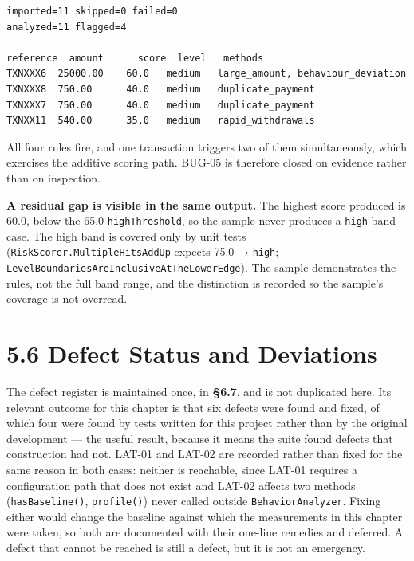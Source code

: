 \documentclass[
  12pt,
]{report}
\begin{document}
\begin{verbatim}
imported=11 skipped=0 failed=0
analyzed=11 flagged=4

reference  amount      score  level   methods
TXNXXX6  25000.00    60.0   medium   large_amount, behaviour_deviation
TXNXXX8  750.00      40.0   medium   duplicate_payment
TXNXXX7  750.00      40.0   medium   duplicate_payment
TXNXX11  540.00      35.0   medium   rapid_withdrawals
\end{verbatim}

All four rules fire, and one transaction triggers two of them
simultaneously, which exercises the additive scoring path. BUG-05 is
therefore closed on evidence rather than on inspection.

\textbf{A residual gap is visible in the same output.} The highest score
produced is 60.0, below the 65.0 \texttt{highThreshold}, so the sample
never produces a \texttt{high}-band case. The high band is covered only
by unit tests (\texttt{RiskScorer.Multiple\-Hits\-Add\-Up} expects 75.0 →
\texttt{high}; \texttt{Level\-Boundaries\-Are\-Inclusive\-At\-The\-Lower\-Edge}). The
sample demonstrates the rules, not the full band range, and the
distinction is recorded so the sample's coverage is not overread.

\section{5.6 Defect Status and
Deviations}\label{defect-status-and-deviations}

The defect register is maintained once, in \textbf{§6.7}, and is not
duplicated here. Its relevant outcome for this chapter is that six
defects were found and fixed, of which four were found by tests written
for this project rather than by the original development --- the useful
result, because it means the suite found defects that construction had
not. LAT-01 and LAT-02 are recorded rather than fixed for the same
reason in both cases: neither is reachable, since LAT-01 requires a
configuration path that does not exist and LAT-02 affects two methods
(\texttt{hasBaseline()}, \texttt{profile()}) never called outside
\texttt{Behavior\-Analyzer}. Fixing either would change the baseline
against which the measurements in this chapter were taken, so both are
documented with their one-line remedies and deferred. A defect that
cannot be reached is still a defect, but it is not an emergency.
\end{document}

